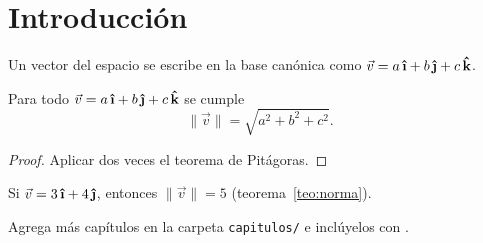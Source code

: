 \chapter{Introducción}
\label{cap:introduccion}

\begin{definicion}
  Un vector del espacio se escribe en la base canónica como
  $\vec{v} = a\,\ihat + b\,\jhat + c\,\khat$.
\end{definicion}

\begin{teorema}
  \label{teo:norma}
  Para todo $\vec{v} = a\,\ihat + b\,\jhat + c\,\khat$ se cumple
  \[
    \lVert \vec{v} \rVert = \sqrt{a^2 + b^2 + c^2}.
  \]
\end{teorema}

\begin{proof}
  Aplicar dos veces el teorema de Pitágoras.
\end{proof}

\begin{ejemplo}
  Si $\vec{v} = 3\,\ihat + 4\,\jhat$, entonces $\lVert \vec{v} \rVert = 5$
  (teorema~\ref{teo:norma}).
\end{ejemplo}

\begin{observacion}
  Agrega más capítulos en la carpeta \texttt{capitulos/} e inclúyelos con \verb||.
\end{observacion}
